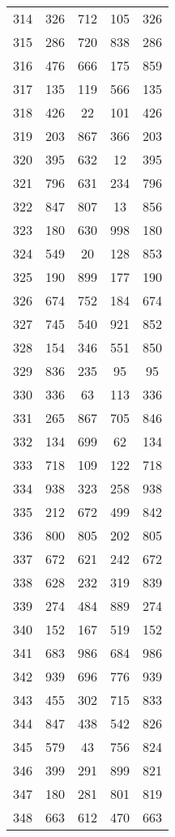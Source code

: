 \documentclass[a4paper,10pt,ngerman]{scrartcl}
\begin{document}
\begin{longtable}[c]{c|c|c|c|c}
    314 & 326 & 712 & 105 & 326 \\
    315 & 286 & 720 & 838 & 286 \\
    316 & 476 & 666 & 175 & 859 \\
    317 & 135 & 119 & 566 & 135 \\
    318 & 426 & 22 & 101 & 426 \\
    319 & 203 & 867 & 366 & 203 \\
    320 & 395 & 632 & 12 & 395 \\
    321 & 796 & 631 & 234 & 796 \\
    322 & 847 & 807 & 13 & 856 \\
    323 & 180 & 630 & 998 & 180 \\
    324 & 549 & 20 & 128 & 853 \\
    325 & 190 & 899 & 177 & 190 \\
    326 & 674 & 752 & 184 & 674 \\
    327 & 745 & 540 & 921 & 852 \\
    328 & 154 & 346 & 551 & 850 \\
    329 & 836 & 235 & 95 & 95 \\
    330 & 336 & 63 & 113 & 336 \\
    331 & 265 & 867 & 705 & 846 \\
    332 & 134 & 699 & 62 & 134 \\
    333 & 718 & 109 & 122 & 718 \\
    334 & 938 & 323 & 258 & 938 \\
    335 & 212 & 672 & 499 & 842 \\
    336 & 800 & 805 & 202 & 805 \\
    337 & 672 & 621 & 242 & 672 \\
    338 & 628 & 232 & 319 & 839 \\
    339 & 274 & 484 & 889 & 274 \\
    340 & 152 & 167 & 519 & 152 \\
    341 & 683 & 986 & 684 & 986 \\
    342 & 939 & 696 & 776 & 939 \\
    343 & 455 & 302 & 715 & 833 \\
    344 & 847 & 438 & 542 & 826 \\
    345 & 579 & 43 & 756 & 824 \\
    346 & 399 & 291 & 899 & 821 \\
    347 & 180 & 281 & 801 & 819 \\
    348 & 663 & 612 & 470 & 663 \\

\end{longtable}
\end{document}
